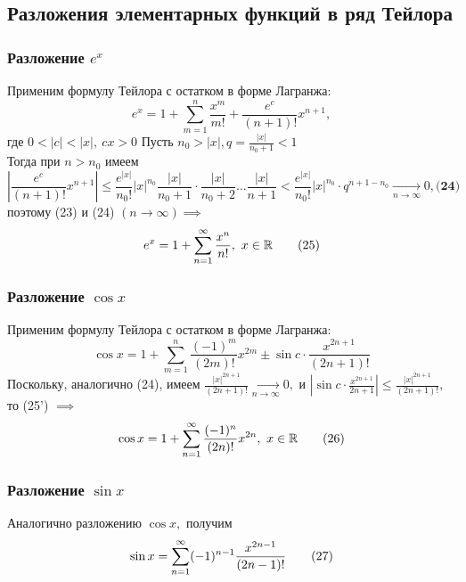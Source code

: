 \documentclass[main]{subfiles}
\begin{document}
 \subsection{Разложения элементарных функций в ряд Тейлора}
 \subsubsection{Разложение \boldmath$e^x$}
 Применим формулу Тейлора с остатком в форме Лагранжа: \[ e^x=1+\sum\limits_{m=1}^n\frac{x^m}{m!}+\frac{e^c}{(n+1)!}x^{n+1},\tag{23} \]
 где $0<|c|<|x|,\ cx>0$ Пусть $n_0>|x|, q=\frac{|x|}{n_0+1}<1$\\
 Тогда при $n>n_0$ имеем \[ |\frac{e^c}{(n+1)!}x^{n+1}|\leq \frac{e^{|x|}}{n_0!}|x|^{n_0}\frac{|x|}{n_0+1}\cdot\frac{|x|}{n_0+2}\dots\frac{|x|}{n+1}<\frac{e^{|x|}}{n_0!}|x|^{n_0}\cdot q^{n+1-n_0}\underset{n\to\infty}{\rightarrow}0,\textbf{(24)} \]
 поэтому (23) и (24) $(n\to \infty) \implies$
 \[ e^x=1+\su\frac{x^n}{n!},\ x\in\R\tag{25} \]
 \subsubsection{Разложение $\cos x$}
 Применим формулу Тейлора с остатком в форме Лагранжа:
 \[ \cos x=1+\sum\limits_{m=1}^n\frac{(-1)^m}{(2m)!}x^{2m}\pm \sin c\cdot\frac{x^{2n+1}}{(2n+1)!}\tag{25'} \]
 Поскольку, аналогично (24), имеем $\frac{|x|^{2n+1}}{(2n+1)!}\underset{n\to\infty}{\rightarrow} 0,$ и $|\sin c\cdot\frac{x^{2n+1}}{2n+1}|\leq\frac{|x|^{2n+1}}{(2n+1)!},$
 то (25') $\implies$ \[ \cos x=1+\su \frac{(-1)^n}{(2n)!}x^{2n},\ x\in\R\tag{26} \]
 \subsubsection{Разложение $\sin x$}
 Аналогично разложению $\cos x,$ получим \[ \sin x=\sum\limits_{n=1}^\infty (-1)^{n-1}\frac{x^{2n-1}}{(2n-1)!}\tag{27} \]
\end{document}
